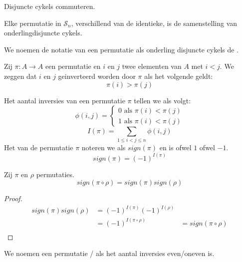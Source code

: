 \documentclass[main.tex]{subfiles}
\begin{document}
\begin{ei}
  \label{ei:disjuncte-cykels-commuteren}
  Disjuncte cykels commuteren.
\end{ei}

\begin{st}
  Elke permutatie in $\mathcal{S}_{n}$, verschillend van de identieke, is de samenstelling van onderlingdisjuncte cykels.

\end{st}

\begin{de}
  We noemen de notatie van een permutatie als onderling disjuncte cykels de .
\end{de}

\begin{de}
  Zij $\pi: A \rightarrow A$ een permutatie en $i$ en $j$ twee elementen van $A$ met $i < j$.
  We zeggen dat $i$ en $j$ geinverteerd worden door $\pi$ als het volgende geldt:
  \[ \pi(i) > \pi(j) \]
\end{de}

\begin{de}
  Het aantal inversies van een permutatie $\pi$ tellen we als volgt:
  \[
  \phi(i,j) =
  \left\{
  \begin{array}{lc}
    0 \text{ als } \pi(i) < \pi(j)\\
    1 \text{ als } \pi(i) < \pi(j)
  \end{array}
  \right.
  \]
  \[ I(\pi) = \sum_{1\le i < j \le n}\phi(i,j) \]
  Het  van de permutatie $\pi$ noteren we als $sign(\pi)$ en is ofwel $1$ ofwel $-1$.
  \[ sign(\pi) = (-1)^{I(\pi)}\] 
\end{de}

\begin{ei}
  \label{ei:samenstelling-permutaties-teken}
  Zij $\pi$ en $\rho$ permutaties.
  \[ sign(\pi\circ\rho) = sign(\pi)sign(\rho) \] 
  \begin{proof}
    \[
    \begin{array}{rll}
      sign(\pi)sign(\rho) &= (-1)^{I(\pi)} (-1)^{I(\rho)} &\\
                          &= (-1)^{I(\pi\circ\rho)}      &=sign(\pi\circ\rho)\\
    \end{array}
    \]
  \end{proof}
\end{ei}

\begin{de}
  We noemen een permutatie / als het aantal inversies even/oneven is.
\end{de}
\end{document}
